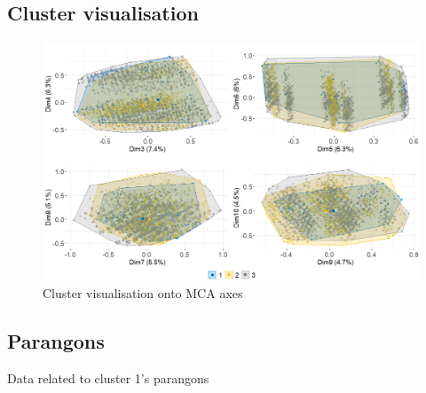 \documentclass[
]{book}
\begin{document}
\hypertarget{cluster-visualisation-1}{%
\subsection*{Cluster visualisation}\label{cluster-visualisation-1}}

\begin{figure}

{\centering \includegraphics[width=15.28in]{./imgs/cluster_plots} 

}

\caption{Cluster visualisation onto MCA axes}\label{fig:clusterplots}
\end{figure}

\hypertarget{parangons}{%
\subsection*{Parangons}\label{parangons}}

Data related to cluster 1's parangons
\end{document}
